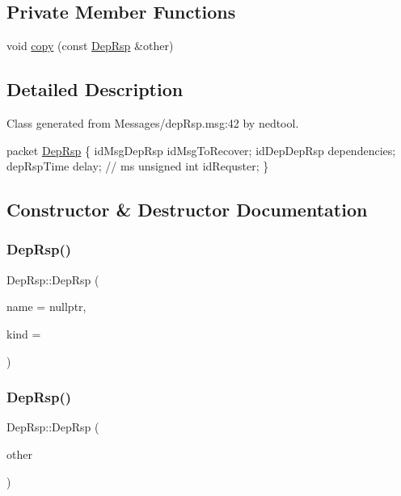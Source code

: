 \subsection*{Private Member Functions}
\begin{DoxyCompactItemize}
\item 
void \hyperlink{classDepRsp_ad8bf8a80dd4586392e1f5179b7b612f5}{copy} (const \hyperlink{classDepRsp}{Dep\+Rsp} \&other)
\end{DoxyCompactItemize}


\subsection{Detailed Description}
Class generated from {\ttfamily Messages/dep\+Rsp.\+msg\+:42} by nedtool. 
\begin{DoxyPre}
packet \hyperlink{classDepRsp}{DepRsp}
\{
    idMsgDepRsp idMsgToRecover;
    idDepDepRsp dependencies;
    depRspTime delay; // ms 
    unsigned int idRequster;
\}
\end{DoxyPre}
 

\subsection{Constructor \& Destructor Documentation}
\mbox{\label{classDepRsp_a86d6896d681e4467ec52c660738893ed}} 
\subsubsection{\texorpdfstring{Dep\+Rsp()}{DepRsp()}\hspace{0.1cm}{\footnotesize\ttfamily [1/2]}}
{\footnotesize\ttfamily Dep\+Rsp\+::\+Dep\+Rsp (\begin{DoxyParamCaption}\item[{const char $\ast$}]{name = {\ttfamily nullptr},  }\item[{short}]{kind = {} }\end{DoxyParamCaption})}

\mbox{\label{classDepRsp_a3b5894b34b151dced8080a6e5757c2a2}} 
\subsubsection{\texorpdfstring{Dep\+Rsp()}{DepRsp()}\hspace{0.1cm}{\footnotesize\ttfamily [2/2]}}
{\footnotesize\ttfamily Dep\+Rsp\+::\+Dep\+Rsp (\begin{DoxyParamCaption}\item[{const \hyperlink{classDepRsp}{Dep\+Rsp} \&}]{other }\end{DoxyParamCaption})}

